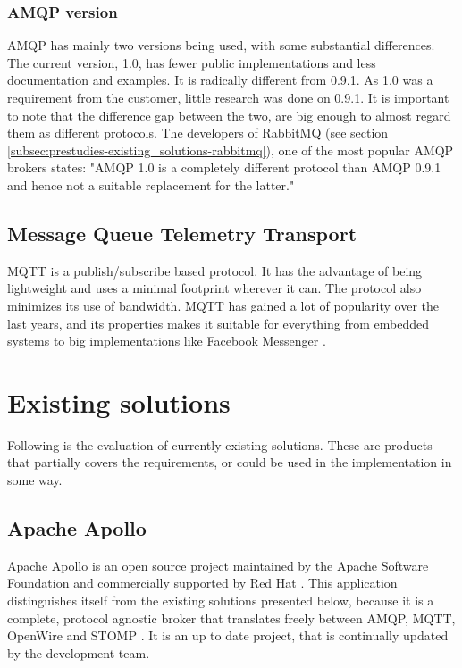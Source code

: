 \subsubsection{AMQP version}
\label{subsec:prestudies-amqp-amqp_version}
AMQP has mainly two versions being used, with some substantial differences. The current version, 1.0, has fewer public implementations and less documentation and examples. It is radically different from 0.9.1. As 1.0 was a requirement from the customer, little research was done on 0.9.1. It is important to note that the difference gap between the two, are big enough to almost regard them as different protocols. The developers of RabbitMQ (see section \ref{subsec:prestudies-existing_solutions-rabbitmq}), one of the most popular AMQP brokers states: "AMQP 1.0 is a completely different protocol than AMQP 0.9.1 and hence not a suitable replacement for the latter."

\subsection{Message Queue Telemetry Transport}
\label{subsec:prestudies-mqtt}
MQTT is a publish/subscribe based protocol. It has the advantage of being lightweight and uses a minimal footprint wherever it can. The protocol also minimizes its use of bandwidth. MQTT has gained a lot of popularity over the last years, and its properties makes it suitable for everything from embedded systems to big implementations like Facebook Messenger \cite{facebook-messenger}.

\section{Existing solutions}
\label{subsec:prestudies-existing_solutions}

Following is the evaluation of currently existing solutions. These are products that partially covers the requirements, or could be used in the implementation in some way.

\subsection{Apache Apollo}
\label{subsec:prestudies-existing_solutions-apache_apollo}

Apache Apollo \cite{apache-apollo} is an open source project maintained by the Apache Software Foundation \cite{apache} and commercially supported by Red Hat \cite{red-hat}. This application distinguishes itself from the existing solutions presented below, because it is a complete, protocol agnostic broker that translates freely between AMQP, MQTT, OpenWire \cite{openwire} and STOMP \cite{stomp}. It is an up to date project, that is continually updated by the development team.

